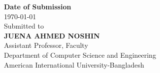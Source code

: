 \begin{titlepage}
\begin{center}
              \textup{\small {\bf Date of Submission} \\ \today}\\[0.3in]

              \normalsize Submitted to \\
              \textbf{JUENA AHMED NOSHIN} \\
              Assistant Professor, Faculty \\
              Department of Computer Science and Engineering \\
              American International University-Bangladesh \\
              \vspace{0.5cm}



       \end{center}

\end{titlepage}
